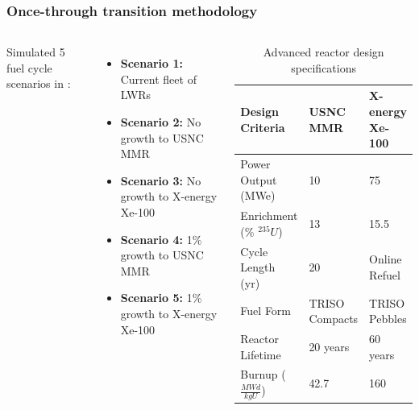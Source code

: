 \begin{frame}
    \frametitle{Once-through transition methodology}
    \begin{columns}
        \column[t]{4.5cm}
        Simulated 5 fuel cycle scenarios in \Cyclus \cite{huff_fundamental_2016}:
    \begin{itemize}
        \item \textbf{Scenario 1:} Current fleet of \glspl{LWR}
        \item \textbf{Scenario 2:} No growth to \gls{USNC} \gls{MMR}
        \item \textbf{Scenario 3:} No growth to X-energy Xe-100
        \item \textbf{Scenario 4:} 1\% growth to \gls{USNC} \gls{MMR}
        \item \textbf{Scenario 5:} 1\% growth to X-energy Xe-100
    \end{itemize}

    \column[t]{5.5cm}
    \begingroup
        \renewcommand{\arraystretch}{1.3} %
        \vspace{-0.8cm}
        \begin{table}[t!]
            \small
            \caption{Advanced reactor design specifications}
            \label{tab:reactor_summary}
            \begin{tabular}{ p{1.5cm} p{1.5cm} p{1.25cm}}
                \hline
                Design Criteria & \gls{USNC} \gls{MMR} 
                    \cite{mitchell_usnc_2020} & 
                    X-energy Xe-100 \cite{harlan_x-energy_2018}
                    \cite{hussain_advances_2018}\\\hline
                Power Output (MWe) & 10 & 75 \\
                Enrichment (\% $^{235}U$) & 13 & 15.5 \\
                Cycle Length (yr) & 20 & Online Refuel\\
                Fuel Form & TRISO Compacts & TRISO Pebbles\\
                Reactor Lifetime & 20 years & 60 years \\
                Burnup ($\frac{MWd}{kg U}$) & 42.7 & 160 \\
                \hline
            \end{tabular}
        \end{table}   
        \endgroup
    \end{columns}
\end{frame}

